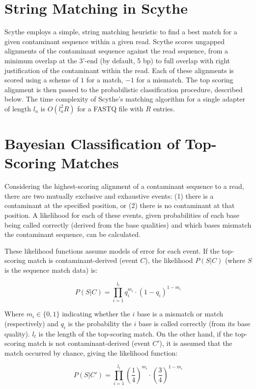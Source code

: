 \documentclass{bioinfo}
\begin{document}
\begin{methods}
\section{String Matching in Scythe}

Scythe employs a simple, string matching heuristic to find a best
match for a given contaminant sequence within a given read. Scythe
scores ungapped alignments of the contaminant sequence against the
read sequence, from a minimum overlap at the 3'-end (by default, 5 bp)
to full overlap with right justification of the contaminant within the
read. Each of these alignments is scored using a scheme of $1$ for a
match, $-1$ for a mismatch. The top scoring alignment is then passed
to the probabilistic classification procedure, described below. The
time complexity of Scythe's matching algorithm for a single adapter of
length $l_a$ is $O(l_a^2 R)$ for a FASTQ file with $R$ entries.


\section{Bayesian Classification of Top-Scoring Matches}

Considering the highest-scoring alignment of a contaminant sequence to
a read, there are two mutually exclusive and exhaustive events: (1)
there is a contaminant at the specified position, or (2) there is no
contaminant at that position. A likelihood for each of these events,
given probabilities of each base being called correctly (derived from
the base qualities) and which bases mismatch the contaminant sequence,
can be calculated.

These likelihood functions assume models of error for each event. If
the top-scoring match is contaminant-derived (event $C$), the
likelihood $P(S | C)$ (where $S$ is the sequence match data) is:

$$ P(S | C) = \prod_{i=1}^{l_t} q_i^{m_i} \cdot (1-q_i)^{1 - m_i} $$

Where $m_i \in \{0, 1\}$ indicating whether the $i$ base is a mismatch
or match (respectively) and $q_i$ is the probability the $i$ base is
called correctly (from its base quality). $l_t$ is the length of the
top-scoring match. On the other hand, if the top-scoring match is not
contaminant-derived (event $C'$), it is assumed that the match
occurred by chance, giving the likelihood function:

$$ P(S | C') = \prod_{i=1}^{l_t} \left(\frac{1}{4}\right)^{m_i} \cdot \left(\frac{3}{4}\right)^{1 - m_i} $$


\end{methods}
\end{document}
